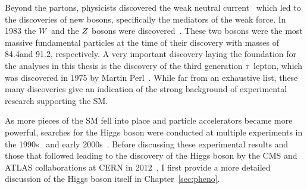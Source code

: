Beyond the partons, physicists discovered the weak neutral current~\cite{HASERT1973121,HASERT1973138} which 
led to the discoveries of new bosons, specifically the mediators
of the weak force.
In 1983 the $W$ and the $Z$ bosons were discovered~\cite{AUBERT1983275,1983398}. 
These two bosons were the
most massive fundamental particles at the time of their discovery with masses of
84.4\GeV and 91.2\GeV, respectively.
A very important discovery laying the foundation for the analyses in this thesis is
the discovery of the third generation $\tau$ lepton, which was discovered
in 1975 by Martin Perl~\cite{PhysRevLett.35.1489}. While far from an exhaustive list,
these many discoveries give an indication of the strong background of experimental
research supporting the SM.

As more pieces of the SM fell into place and particle accelerators became more powerful,
searches for the Higgs boson were conducted at multiple experiments in the 
1990s~\cite{Barate:2000ts,Abdallah:2003ip,Achard:2001pj,Abbiendi:2000ac} and early
2000s~\cite{Aaltonen:2012jh, Abazov:2012zj}. 
Before discussing these experimental results and those that followed leading to the
discovery of the Higgs boson by the CMS and ATLAS collaborations at 
CERN in 2012~\cite{Aad:2012tfa, Chatrchyan:2012xdj, Chatrchyan:2013lba}, 
I first provide a more detailed discussion
of the Higgs boson itself in Chapter~\ref{sec:pheno}.



